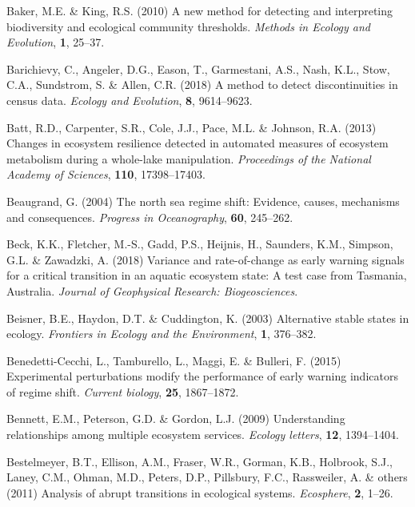 \documentclass[12pt,twoside,openany]{reedthesis}
\begin{document}
\leavevmode\hypertarget{ref-baker2010new}{}%
Baker, M.E. \& King, R.S. (2010) A new method for detecting and interpreting biodiversity and ecological community thresholds. \emph{Methods in Ecology and Evolution}, \textbf{1}, 25--37.

\leavevmode\hypertarget{ref-barichievy2018method}{}%
Barichievy, C., Angeler, D.G., Eason, T., Garmestani, A.S., Nash, K.L., Stow, C.A., Sundstrom, S. \& Allen, C.R. (2018) A method to detect discontinuities in census data. \emph{Ecology and Evolution}, \textbf{8}, 9614--9623.

\leavevmode\hypertarget{ref-batt2013changes}{}%
Batt, R.D., Carpenter, S.R., Cole, J.J., Pace, M.L. \& Johnson, R.A. (2013) Changes in ecosystem resilience detected in automated measures of ecosystem metabolism during a whole-lake manipulation. \emph{Proceedings of the National Academy of Sciences}, \textbf{110}, 17398--17403.

\leavevmode\hypertarget{ref-beaugrand2004north}{}%
Beaugrand, G. (2004) The north sea regime shift: Evidence, causes, mechanisms and consequences. \emph{Progress in Oceanography}, \textbf{60}, 245--262.

\leavevmode\hypertarget{ref-beck_variance_2018}{}%
Beck, K.K., Fletcher, M.-S., Gadd, P.S., Heijnis, H., Saunders, K.M., Simpson, G.L. \& Zawadzki, A. (2018) Variance and rate-of-change as early warning signals for a critical transition in an aquatic ecosystem state: A test case from Tasmania, Australia. \emph{Journal of Geophysical Research: Biogeosciences}.

\leavevmode\hypertarget{ref-beisner2003alternative}{}%
Beisner, B.E., Haydon, D.T. \& Cuddington, K. (2003) Alternative stable states in ecology. \emph{Frontiers in Ecology and the Environment}, \textbf{1}, 376--382.

\leavevmode\hypertarget{ref-benedetti2015experimental}{}%
Benedetti-Cecchi, L., Tamburello, L., Maggi, E. \& Bulleri, F. (2015) Experimental perturbations modify the performance of early warning indicators of regime shift. \emph{Current biology}, \textbf{25}, 1867--1872.

\leavevmode\hypertarget{ref-bennett2009understanding}{}%
Bennett, E.M., Peterson, G.D. \& Gordon, L.J. (2009) Understanding relationships among multiple ecosystem services. \emph{Ecology letters}, \textbf{12}, 1394--1404.

\leavevmode\hypertarget{ref-bestelmeyer_analysis_2011}{}%
Bestelmeyer, B.T., Ellison, A.M., Fraser, W.R., Gorman, K.B., Holbrook, S.J., Laney, C.M., Ohman, M.D., Peters, D.P., Pillsbury, F.C., Rassweiler, A. \& others (2011) Analysis of abrupt transitions in ecological systems. \emph{Ecosphere}, \textbf{2}, 1--26.
\end{document}
